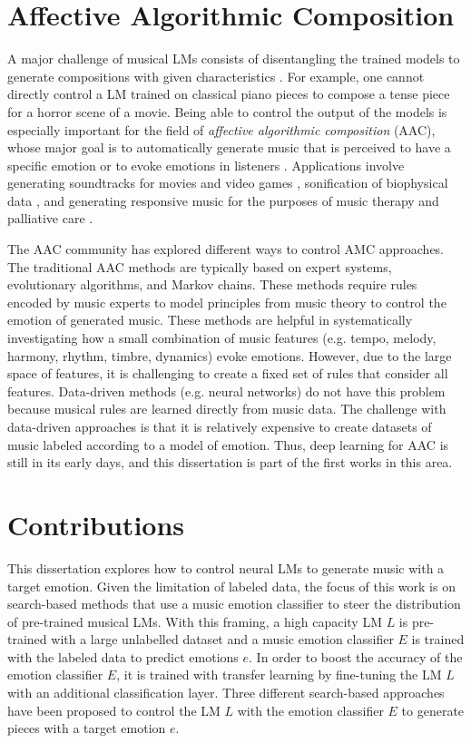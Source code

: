 \section{Affective Algorithmic Composition}

A major challenge of musical LMs consists of disentangling the trained models to generate compositions with given characteristics \cite{ferreira_2019}. For example, one cannot directly control a LM trained on classical piano pieces to compose a tense piece for a horror scene of a movie. Being able to control the output of the models is especially important for the field of \textit{affective algorithmic composition} (AAC), whose major goal is to automatically generate music that is perceived to have a specific emotion or to evoke emotions in listeners \cite{williams2015investigating}. Applications involve generating soundtracks for movies and video games \cite{williams2015dynamic}, sonification of biophysical data \cite{Chen2015}, and generating responsive music for the purposes of music therapy and palliative care \cite{miranda2011brain}.

The AAC community has explored different ways to control AMC approaches. The traditional AAC methods are typically based on expert systems, evolutionary algorithms, and Markov chains. These methods require rules encoded by music experts to model principles from music theory to control the emotion of generated music. These methods are helpful in systematically investigating how a small combination of music features (e.g. tempo, melody, harmony, rhythm, timbre, dynamics) evoke emotions. However, due to the large space of features, it is challenging to create a fixed set of rules that consider all features. Data-driven methods (e.g. neural networks) do not have this problem because musical rules are learned directly from music data. The challenge with data-driven approaches is that it is relatively expensive to create datasets of music labeled according to a model of emotion. Thus, deep learning for AAC is still in its early days, and this dissertation is part of the first works in this area.

\section{Contributions}

This dissertation explores how to control neural LMs to generate music with a target emotion. Given the limitation of labeled data, the focus of this work is on search-based methods that use a music emotion classifier to steer the distribution of pre-trained musical LMs. With this framing, a high capacity LM $L$ is pre-trained with a large unlabelled dataset and a music emotion classifier $E$ is trained with the labeled data to predict emotions $e$. In order to boost the accuracy of the emotion classifier $E$, it is trained with transfer learning by fine-tuning the LM $L$ with an additional classification layer. Three different search-based approaches have been proposed to control the LM $L$ with the emotion classifier $E$ to generate pieces with a target emotion $e$.

